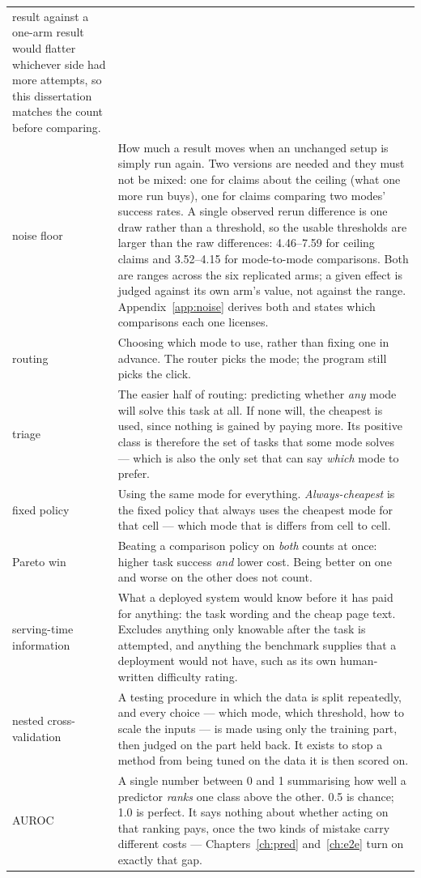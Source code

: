 \begin{center}
\begin{tabularx}{\textwidth}{@{}lX@{}}
result against a one-arm result would flatter whichever side had more
attempts, so this dissertation matches the count before comparing. \\ noise
floor & How much a result moves when an unchanged setup is simply run again.
Two versions are needed and they must not be mixed: one for claims about the
ceiling (what one more run buys), one for claims comparing two modes' success
rates. A single observed rerun difference is one draw rather than a threshold,
so the usable thresholds are larger than the raw differences: 4.46--7.59\pp{}
for ceiling claims and 3.52--4.15\pp{} for mode-to-mode comparisons. Both are
ranges across the six replicated arms; a given effect is judged against its own
arm's value, not against the range.
Appendix~\ref{app:noise} derives both and states which comparisons each one
licenses. \\
routing     & Choosing which mode to use, rather than fixing one in advance.
              The router picks the mode; the program still picks the click. \\
triage & The easier half of routing: predicting whether \emph{any} mode will
solve this task at all. If none will, the cheapest is used, since nothing is
gained by paying more. Its positive class is therefore the set of tasks that
some mode solves --- which is also the only set that can say \emph{which} mode
to prefer. \\
fixed policy & Using the same mode for everything. \emph{Always-cheapest} is
the fixed policy that always uses the cheapest mode for that cell --- which
mode that is differs from cell to cell. \\
Pareto win  & Beating a comparison policy on \emph{both} counts at once: higher
              task success \emph{and} lower cost. Being better on one and worse
              on the other does not count. \\
serving-time information & What a deployed system would know before it has paid
              for anything: the task wording and the cheap page text. Excludes
              anything only knowable after the task is attempted, and anything
              the benchmark supplies that a deployment would not have, such as
              its own human-written difficulty rating. \\
nested cross-validation & A testing procedure in which the data is split
              repeatedly, and every choice --- which mode, which threshold, how
              to scale the inputs --- is made using only the training part, then
              judged on the part held back. It exists to stop a method from
              being tuned on the data it is then scored on. \\
AUROC & A single number between 0 and 1 summarising how well a predictor
\emph{ranks} one class above the other. 0.5 is chance; 1.0 is perfect. It says
nothing about whether acting on that ranking pays, once the two kinds of
mistake carry different costs --- Chapters~\ref{ch:pred} and~\ref{ch:e2e} turn
on exactly that gap. \\
\bottomrule
\end{tabularx}
\end{center}

\clearpage
{}
